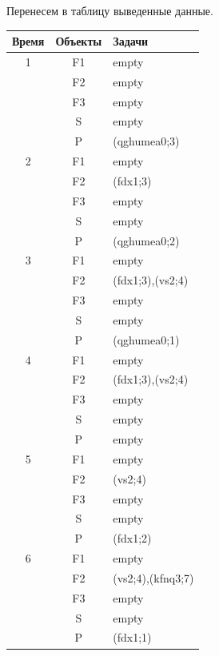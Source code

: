 \documentclass[12pt]{article}
\begin{document}
{	Перенесем в таблицу выведенные данные.
	
	\begin{tabular}{|c|c|l|}
		\hline
		{\bf Время} & {\bf Объекты} & {\bf Задачи}\\
		\hline
		1 & F1 & empty \\
		\cline{2-3}
		& F2 & empty \\
		\cline{2-3}
		& F3 & empty \\
		\cline{2-3}
		& S & empty \\
		\cline{2-3}
		& P & (qghumea0;3) \\
		\hline
		
		2 & F1 & empty \\
		\cline{2-3}
		& F2 & (fdx1;3) \\
		\cline{2-3}
		& F3 & empty \\
		\cline{2-3}
		& S & empty \\
		\cline{2-3}
		& P & (qghumea0;2) \\
		\hline
		
		
		3 & F1 & empty\\ 
		\cline{2-3}
		& F2 & (fdx1;3),(vs2;4)\\
		\cline{2-3}
		& F3 & empty\\
		\cline{2-3}
		& S & empty\\
		\cline{2-3}
		& P & (qghumea0;1)\\
		\hline
		
		
		4 & F1 & empty\\ 
		\cline{2-3}
		& F2 & (fdx1;3),(vs2;4)\\
		\cline{2-3}
		& F3 & empty\\
		\cline{2-3}
		& S & empty\\
		\cline{2-3}
		& P & empty\\
		\hline
		
		
		5 & F1 & empty\\ 
		\cline{2-3}
		& F2 & (vs2;4)\\
		\cline{2-3}
		& F3 & empty\\
		\cline{2-3}
		& S & empty\\
		\cline{2-3}
		& P & (fdx1;2)\\
		\hline
		
		6 & F1 & empty\\ 
		\cline{2-3}
		& F2 & (vs2;4),(kfnq3;7)\\
		\cline{2-3}
		& F3 & empty\\
		\cline{2-3}
		& S & empty\\
		\cline{2-3}
		& P & (fdx1;1)\\
		\hline
		

\end{tabular}}
\end{document}
